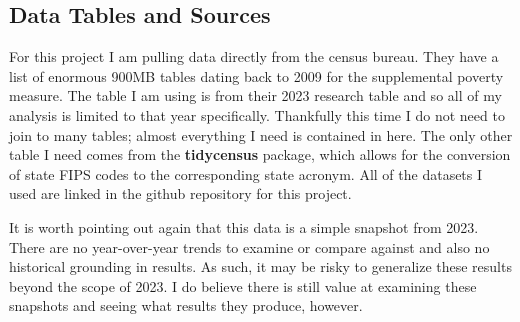 \subsection*{Data Tables and Sources}

For this project I am pulling data directly from the census bureau. They have a list of enormous 900MB tables dating back to 2009 for the supplemental poverty measure. The table I am using is from their 2023 research table and so all of my analysis is limited to that year specifically. Thankfully this time I do not need to join to many tables; almost everything I need is contained in here. The only other table I need comes from the \textbf{tidycensus} package, which allows for the conversion of state FIPS codes to the corresponding state acronym. All of the datasets I used are linked in the github repository for this project. 

It is worth pointing out again that this data is a simple snapshot from 2023. There are no year-over-year trends to examine or compare against and also no historical grounding in results. As such, it may be risky to generalize these results beyond the scope of 2023. I do believe there is still value at examining these snapshots and seeing what results they produce, however. 